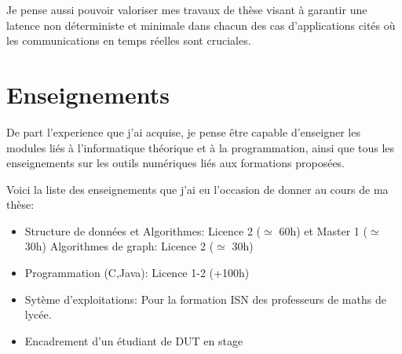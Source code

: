 \documentclass[a4paper,10pt]{article}
\begin{document}
Je pense aussi pouvoir valoriser mes travaux de thèse visant à garantir une latence non déterministe et minimale dans chacun des cas d'applications cités où les communications en temps réelles sont cruciales. 

\section{Enseignements}
De part l'experience que j'ai acquise, je pense être capable d'enseigner les modules liés à l'informatique théorique et à la programmation, ainsi que tous les enseignements sur les outils numériques liés aux formations proposées.

Voici la liste des enseignements que j'ai eu l'occasion de donner au cours de ma thèse:
\begin{itemize}
\item Structure de données et Algorithmes: Licence 2 ($\simeq$ 60h) et Master 1 ($\simeq$ 30h) Algorithmes de graph: Licence 2 ($\simeq$ 30h)
\item Programmation (C,Java): Licence 1-2 (+100h)
\item Sytème d’exploitations: Pour la formation ISN des professeurs de maths de lycée.
\item Encadrement d’un étudiant de DUT en stage
\end{itemize}
\end{document}
